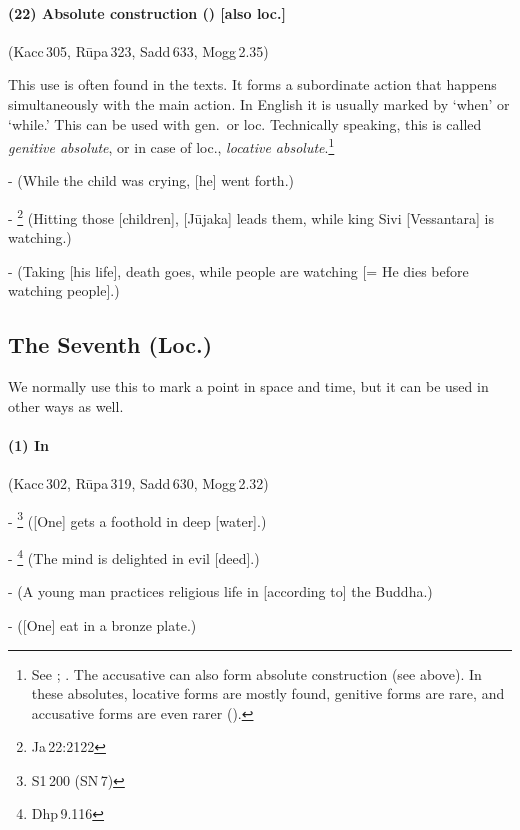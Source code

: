 \paragraph*{(22) Absolute construction () [also loc.]} (Kacc\,305, R\=upa\,323, Sadd\,633, Mogg\,2.35)\par
This use is often found in the texts. It forms a subordinate action that happens simultaneously with the main action. In English it is usually marked by `when' or `while.' This can be used with gen.\ or loc. Technically speaking, this is called \emph{genitive absolute}, or in case of loc., \emph{locative absolute}.\footnote{See \citealp[p.~58, 103]{warder:intro}; \citealp[p.~37, 38]{collins:grammar}. The accusative can also form absolute construction (see above). In these absolutes, locative forms are mostly found, genitive forms are rare, and accusative forms are even rarer (\citealp[p.~336]{perniola:grammar}).}\par
-  (While the child was crying, [he] went forth.)\par
- \footnote{Ja\,22:2122} (Hitting those [children], [J\=ujaka] leads them, while king Sivi [Vessantara] is watching.)\par
-  (Taking [his life], death goes, while people are watching [= He dies before watching people].)\par

{}
\subsection*{The Seventh  (Loc.)}

We normally use this  to mark a point in space and time, but it can be used in other ways as well.

\paragraph*{(1) In } (Kacc\,302, R\=upa\,319, Sadd\,630, Mogg\,2.32)\par
- \footnote{S1\,200 (SN\,7)} ([One] gets a foothold in deep [water].)\par
- \footnote{Dhp\,9.116} (The mind is delighted in evil [deed].)\par
-  (A young man practices religious life in [according to] the Buddha.)\par
-  ([One] eat in a bronze plate.)\par

